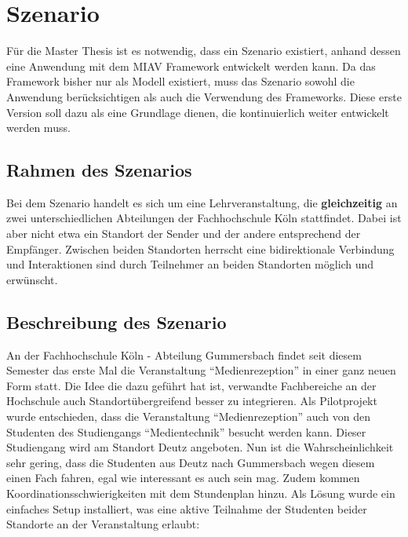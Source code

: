 
\chapter{Szenario} %
\label{cha:szenario}

Für die Master Thesis ist es notwendig, dass ein Szenario existiert, anhand dessen eine Anwendung mit dem MIAV Framework entwickelt werden kann. Da das Framework bisher nur als Modell existiert, muss das Szenario sowohl die Anwendung berücksichtigen als auch die Verwendung des Frameworks. Diese erste Version soll dazu als eine Grundlage dienen, die kontinuierlich weiter entwickelt werden muss.

\section{Rahmen des Szenarios} %
\label{sec:rahmen_des_szenarios}

Bei dem Szenario handelt es sich um eine Lehrveranstaltung, die \textbf{gleichzeitig} an zwei unterschiedlichen Abteilungen der Fachhochschule Köln stattfindet. Dabei ist aber nicht etwa ein Standort der Sender und der andere entsprechend der Empfänger. Zwischen beiden Standorten herrscht eine bidirektionale Verbindung und Interaktionen sind durch Teilnehmer an beiden Standorten möglich und erwünscht.


\section{Beschreibung des Szenario} %
\label{sec:beschreibung_des_szenario}

An der Fachhochschule Köln - Abteilung Gummersbach findet seit diesem Semester das erste Mal die Veranstaltung "`Medienrezeption"' in einer ganz neuen Form statt. Die Idee die dazu geführt hat ist, verwandte Fachbereiche an der Hochschule auch Standortübergreifend besser zu integrieren. Als Pilotprojekt wurde entschieden, dass die Veranstaltung "`Medienrezeption"' auch von den Studenten des Studiengangs "`Medientechnik"' besucht werden kann. Dieser Studiengang wird am Standort Deutz angeboten. Nun ist die Wahrscheinlichkeit sehr gering, dass die Studenten aus Deutz nach Gummersbach wegen diesem einen Fach fahren, egal wie interessant es auch sein mag. Zudem kommen Koordinationsschwierigkeiten mit dem Stundenplan hinzu. Als Lösung wurde ein einfaches Setup installiert, was eine aktive Teilnahme der Studenten beider Standorte an der Veranstaltung erlaubt:

